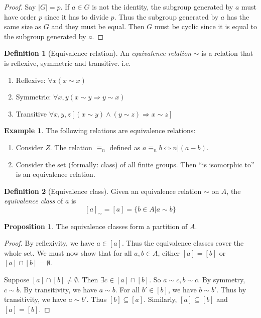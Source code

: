 \documentclass[a4paper]{article}
\theoremstyle{definition}
\newtheorem*{prop}{Proposition}
\newtheorem*{defi}{Definition}
\newtheorem*{eg}{Example}
\begin{document}
\begin{proof}
  Say $|G| = p$. If $a\in G$ is not the identity, the subgroup generated by $a$ must have order $p$ since it has to divide $p$. Thus the subgroup generated by $a$ has the same size as $G$ and they must be equal. Then $G$ must be cyclic since it is equal to the subgroup generated by $a$.
\end{proof}

\begin{defi}[Equivalence relation]
  An \emph{equivalence relation} $\sim$ is a relation that is reflexive, symmetric and transitive. i.e.
  \begin{enumerate}
  \item Reflexive: $\forall x(x\sim x)$
  \item Symmetric: $\forall x, y(x\sim y \Rightarrow y\sim x)$
  \item Transitive $\forall x, y, z[(x\sim y) \wedge (y\sim z)\Rightarrow x\sim z]$
  \end{enumerate}
\end{defi}

\begin{eg}
  The following relations are equivalence relations:
  \begin{enumerate}
  \item Consider $Z$. The relation $\equiv_n$ defined as $a\equiv_n b \Leftrightarrow n | (a - b)$.
  \item Consider the set (formally: class) of all finite groups. Then ``is isomorphic to'' is an equivalence relation.
  \end{enumerate}
\end{eg}

\begin{defi}[Equivalence class]
  Given an equivalence relation $\sim$ on $A$, the \emph{equivalence class} of $a$ is
  \[
  [a]_{\sim} = [a] = \{b\in A|a\sim b\}
  \]
\end{defi}

\begin{prop}
  The equivalence classes form a partition of $A$.
\end{prop}

\begin{proof}
  By reflexivity, we have $a\in [a]$. Thus the equivalence classes cover the whole set. We must now show that for all $a, b\in A$, either $[a] = [b]$ or $[a]\cap [b]=\emptyset$.

Suppose $[a]\cap[b]\not=\emptyset$. Then $\exists c\in [a]\cap[b]$. So $a\sim c, b\sim c$. By symmetry, $c\sim b$. By transitivity, we have $a\sim b$. For all $b'\in [b]$, we have $b\sim b'$. Thus by transitivity, we have $a\sim b'$. Thus $[b]\subseteq[a]$. Similarly, $[a]\subseteq[b]$  and $[a] = [b]$.
\end{proof}
\end{document}
